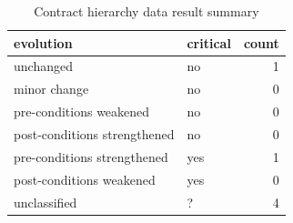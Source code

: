 \begin{table}[]
\centering
\caption{Contract hierarchy data result summary}
\label{tab:results-hierarchy}
\begin{tabular}{|l|l|r|} \hline
   evolution & critical & count \\ \hline
   unchanged & no & 1  \\
   minor change & no & 0  \\
   pre-conditions weakened & no & 0  \\
   post-conditions strengthened & no & 0  \\ \hline
   pre-conditions strengthened & yes & 1  \\
   post-conditions weakened & yes & 0  \\ \hline
   unclassified & ? & 4  \\ \hline
\end{tabular}
\end{table}
